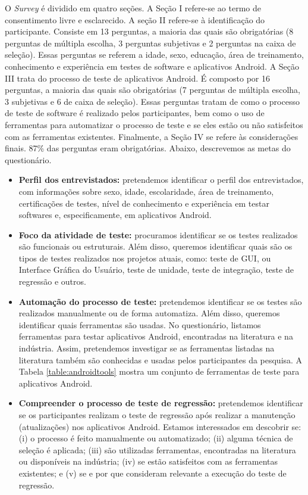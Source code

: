 O \textit{Survey} é dividido em quatro seções. A Seção I refere-se ao termo de consentimento livre e esclarecido. A seção II refere-se à identificação do participante. Consiste em 13 perguntas, a maioria das quais são obrigatórias (8 perguntas de múltipla escolha, 3 perguntas subjetivas e 2 perguntas na caixa de seleção). Essas perguntas se referem a idade, sexo, educação, área de treinamento, conhecimento e experiência em testes de software e aplicativos Android. A Seção III trata do processo de teste de aplicativos Android. 
É composto por 16 perguntas, a maioria das quais são obrigatórias (7 perguntas de múltipla escolha, 3 subjetivas e 6 de caixa de seleção). Essas perguntas tratam de como o processo de teste de software é realizado pelos participantes, bem como o uso de ferramentas para automatizar o processo de teste e se eles estão ou não satisfeitos com as ferramentas existentes. Finalmente, a Seção IV se refere às considerações finais. 87\% das perguntas eram obrigatórias. Abaixo, descrevemos as metas do questionário.

\begin{itemize}
    \item \textbf{Perfil dos entrevistados:} pretendemos identificar o perfil dos entrevistados, com informações sobre sexo, idade, escolaridade, área de treinamento, certificações de testes, nível de conhecimento e experiência em testar softwares e, especificamente, em aplicativos Android.
    
    \item \textbf{Foco da atividade de teste:} procuramos identificar se os testes realizados são funcionais ou estruturais. Além disso, queremos identificar quais são os tipos de testes realizados nos projetos atuais, como: teste de \ac{GUI}, ou Interface Gráfica do Usuário, teste de unidade, teste de integração, teste de regressão e outros.
    
    \item \textbf{Automação do processo de teste:} pretendemos identificar se os testes são realizados manualmente ou de forma automatiza. Além disso, queremos identificar quais ferramentas são usadas. No questionário, listamos ferramentas para testar aplicativos Android, encontradas na literatura e na indústria. Assim, pretendemos investigar se as ferramentas listadas na literatura também são conhecidas e usadas pelos participantes da pesquisa. A Tabela \ref{table:androidtools} mostra um conjunto de ferramentas de teste para aplicativos Android.
    
    \item \textbf{Compreender o processo de teste de regressão:} pretendemos identificar se os participantes realizam o teste de regressão após realizar a manutenção (atualizações) nos aplicativos Android. Estamos interessados em descobrir se: (i) o processo é feito manualmente ou automatizado; (ii) alguma técnica de seleção é aplicada; (iii) são utilizadas ferramentas, encontradas na literatura ou disponíveis na indústria; (iv) se estão satisfeitos com as ferramentas existentes; e (v) se e por que consideram relevante a execução do teste de regressão.
    
\end{itemize}

